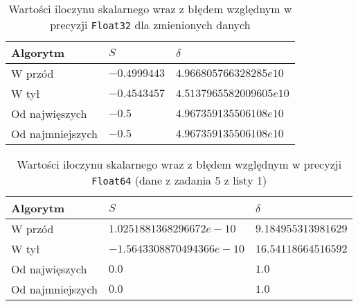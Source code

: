 \documentclass[12pt]{article}
\begin{document}
        \begin{table}[h!]
            \vspace{20pt}
            \centering
            \begin{tabularx}{0.67\textwidth}{l l l}
                \hline
                Algorytm & $S$ & $\delta$ \\
                \hline
                W przód & $-0.4999443$ & $4.966805766328285e10$ \\
                W tył & $-0.4543457$ & $4.5137965582009605e10$ \\
                Od najwięszych & $-0.5$ & $4.967359135506108e10$ \\
                Od najmniejszych & $-0.5$ & $4.967359135506108e10$ \\
                \hline
            \end{tabularx}
            \caption{Wartości iloczynu skalarnego wraz z błędem względnym w precyzji \texttt{Float32} dla zmienionych danych}
            \label{table:dot_prod_32_mod}
        \end{table}

        \begin{table}[h!]
            \vspace{20pt}
            \centering
            \begin{tabularx}{0.78\textwidth}{l l l}
                \hline
                Algorytm & $S$ & $\delta$ \\
                \hline
                W przód & $1.0251881368296672e-10$ & $9.184955313981629$ \\
                W tył & $-1.5643308870494366e-10$ & $16.54118664516592$ \\
                Od najwięszych & $0.0$ & $1.0$ \\
                Od najmniejszych & $0.0$ & $1.0$ \\
                \hline
            \end{tabularx}
            \caption{Wartości iloczynu skalarnego wraz z błędem względnym w precyzji \texttt{Float64} (dane z zadania 5 z listy 1)}
            \label{table:dot_prod_64}
        \end{table}
\end{document}
